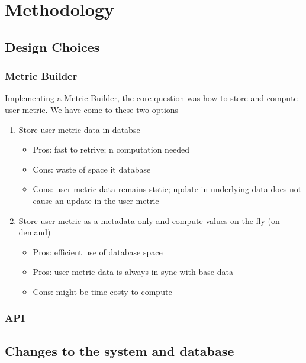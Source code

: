 \chapter{Methodology}

\section{Design Choices}

\subsection{Metric Builder}

Implementing a Metric Builder, the core question was how to store and compute user metric. We have come to these two options
\begin{enumerate}
  \item
    Store user metric data in databse
    \begin{itemize}
      \item
        Pros: fast to retrive; n computation needed
      \item
        Cons: waste of space it database
      \item
        Cons: user metric data remains ststic; update in underlying data does not cause an update in the user metric
    \end{itemize}
  \item
    Store user metric as a metadata only and compute values on-the-fly (on-demand)
    \begin{itemize}
      \item
        Pros: efficient use of database space
      \item
        Pros: user metric data is always in sync with base data
      \item
        Cons: might be time costy to compute
    \end{itemize}
\end{enumerate}

\subsection{API}

\section{Changes to the system and database}
